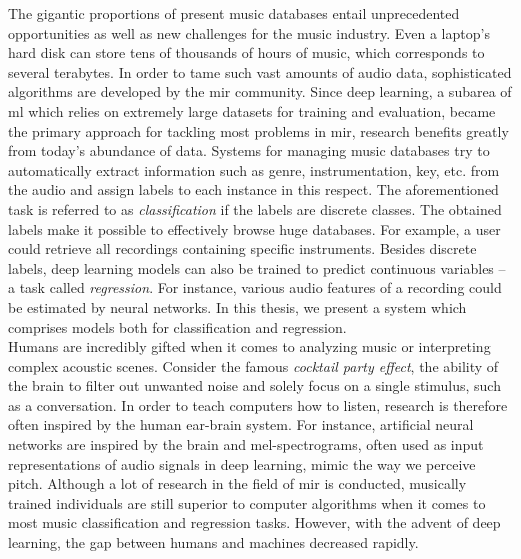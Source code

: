 The gigantic proportions of present music databases entail unprecedented opportunities as well as new challenges for the music industry. Even a laptop's hard disk can store tens of thousands of hours of music, which corresponds to several terabytes. In order to tame such vast amounts of audio data, sophisticated algorithms are developed by the \gls{mir} community. Since deep learning, a subarea of \gls{ml} which relies on extremely large datasets for training and evaluation, became the primary approach for tackling most problems in \gls{mir}, research benefits greatly from today's abundance of data. Systems for managing music databases try to automatically extract information such as genre, instrumentation, key, etc. from the audio and assign labels to each instance in this respect. The aforementioned task is referred to as \textit{classification} if the labels are discrete classes. The obtained labels make it possible to effectively browse huge databases. For example, a user could retrieve all recordings containing specific instruments. Besides discrete labels, deep learning models can also be trained to predict continuous variables -- a task called \textit{regression}. For instance, various audio features of a recording could be estimated by neural networks. In this thesis, we present a system which comprises models both for classification and regression.\\

Humans are incredibly gifted when it comes to analyzing music or interpreting complex acoustic scenes. Consider the famous \textit{cocktail party effect}, the ability of the brain to filter out unwanted noise and solely focus on a single stimulus, such as a conversation. In order to teach computers how to listen, research is therefore often inspired by the human ear-brain system. For instance, artificial neural networks are inspired by the brain and mel-spectrograms, often used as input representations of audio signals in deep learning, mimic the way we perceive pitch. Although a lot of research in the field of \gls{mir} is conducted, musically trained individuals are still superior to computer algorithms when it comes to most music classification and regression tasks. However, with the advent of deep learning, the gap between humans and machines decreased rapidly.
